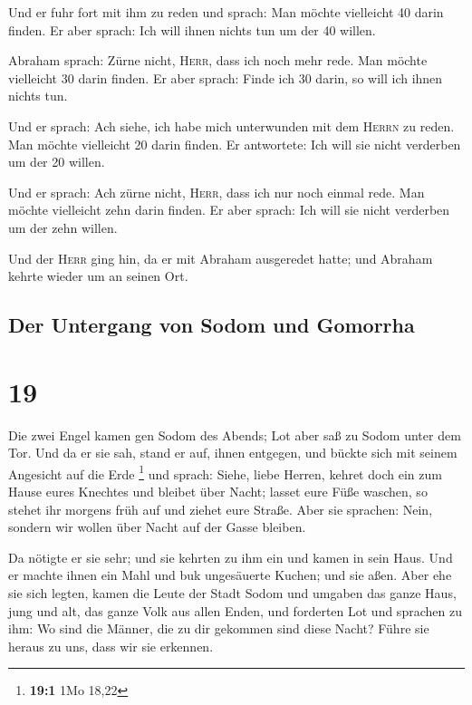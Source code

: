  Und er fuhr fort mit ihm zu reden und sprach: Man möchte
vielleicht 40 darin finden. Er aber sprach: Ich will ihnen nichts tun um
der 40 willen.

 Abraham sprach: Zürne nicht, \textsc{Herr}, dass ich
noch mehr rede. Man möchte vielleicht 30 darin finden. Er aber sprach:
Finde ich 30 darin, so will ich ihnen nichts tun.

 Und er sprach: Ach siehe, ich habe mich unterwunden mit
dem \textsc{Herrn} zu reden. Man möchte vielleicht 20 darin finden. Er
antwortete: Ich will sie nicht verderben um der 20 willen.

 Und er sprach: Ach zürne nicht, \textsc{Herr}, dass ich
nur noch einmal rede. Man möchte vielleicht zehn darin finden. Er aber
sprach: Ich will sie nicht verderben um der zehn willen.

 Und der \textsc{Herr} ging hin, da er mit Abraham
ausgeredet hatte; und Abraham kehrte wieder um an seinen Ort.

\hypertarget{der-untergang-von-sodom-und-gomorrha}{%
\subsection{Der Untergang von Sodom und
Gomorrha}\label{der-untergang-von-sodom-und-gomorrha}}

\hypertarget{section-18}{%
\section{19}\label{section-18}}

 Die zwei Engel kamen gen Sodom des Abends; Lot aber saß
zu Sodom unter dem Tor. Und da er sie sah, stand er auf, ihnen entgegen,
und bückte sich mit seinem Angesicht auf die Erde \footnote{\textbf{19:1}
  1Mo 18,22}  und sprach: Siehe, liebe Herren, kehret doch
ein zum Hause eures Knechtes und bleibet über Nacht; lasset eure Füße
waschen, so stehet ihr morgens früh auf und ziehet eure Straße. Aber sie
sprachen: Nein, sondern wir wollen über Nacht auf der Gasse bleiben.

 Da nötigte er sie sehr; und sie kehrten zu ihm ein und
kamen in sein Haus. Und er machte ihnen ein Mahl und buk ungesäuerte
Kuchen; und sie aßen.  Aber ehe sie sich legten, kamen die
Leute der Stadt Sodom und umgaben das ganze Haus, jung und alt, das
ganze Volk aus allen Enden,  und forderten Lot und
sprachen zu ihm: Wo sind die Männer, die zu dir gekommen sind diese
Nacht? Führe sie heraus zu uns, dass wir sie erkennen.

